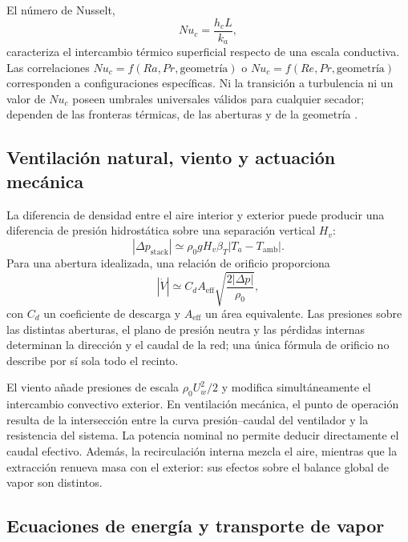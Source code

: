 El número de Nusselt,
\begin{equation}
Nu_c=\frac{h_cL}{k_a},
\label{eq:nuc}
\end{equation}
caracteriza el intercambio térmico superficial respecto de una escala conductiva. Las correlaciones $Nu_c=f(Ra,Pr,\text{geometría})$ o $Nu_c=f(Re,Pr,\text{geometría})$ corresponden a configuraciones específicas. Ni la transición a turbulencia ni un valor de $Nu_c$ poseen umbrales universales válidos para cualquier secador; dependen de las fronteras térmicas, de las aberturas y de la geometría \cite{bergman2017,devahl1983}.

\subsection{Ventilación natural, viento y actuación mecánica}

La diferencia de densidad entre el aire interior y exterior puede producir una diferencia de presión hidrostática sobre una separación vertical $H_v$:
\begin{equation}
|\Delta p_{\mathrm{stack}}|\simeq
\rho_0gH_v\beta_T|T_a-T_{\mathrm{amb}}|.
\label{eq:presion_flotacion}
\end{equation}
Para una abertura idealizada, una relación de orificio proporciona
\begin{equation}
|\dot V|\simeq C_dA_{\mathrm{eff}}
\sqrt{\frac{2|\Delta p|}{\rho_0}},
\label{eq:caudal_abertura}
\end{equation}
con $C_d$ un coeficiente de descarga y $A_{\mathrm{eff}}$ un área equivalente. Las presiones sobre las distintas aberturas, el plano de presión neutra y las pérdidas internas determinan la dirección y el caudal de la red; una única fórmula de orificio no describe por sí sola todo el recinto.

El viento añade presiones de escala $\rho_0U_w^2/2$ y modifica simultáneamente el intercambio convectivo exterior. En ventilación mecánica, el punto de operación resulta de la intersección entre la curva presión--caudal del ventilador y la resistencia del sistema. La potencia nominal no permite deducir directamente el caudal efectivo. Además, la recirculación interna mezcla el aire, mientras que la extracción renueva masa con el exterior: sus efectos sobre el balance global de vapor son distintos.

\subsection{Ecuaciones de energía y transporte de vapor}

